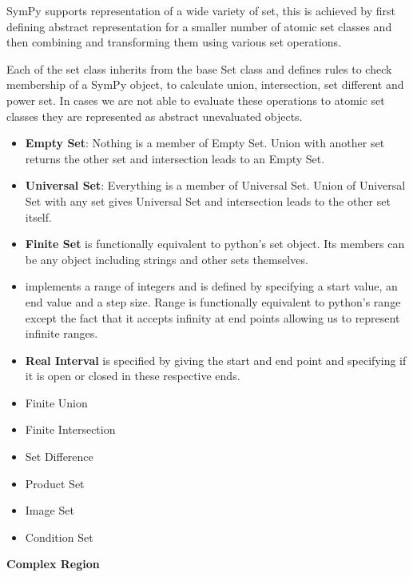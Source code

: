 
SymPy supports representation of a wide variety of set, this is achieved by
first defining abstract representation for a smaller number of atomic set
classes and then combining and transforming them using various set operations.

Each of the set class inherits from the base Set class and defines
rules to check membership of a SymPy object, to calculate union, intersection,
set different and power set. In cases we are not able to evaluate these
operations to atomic set classes they are represented as abstract unevaluated
objects.


\begin{itemize}

    \item \textbf{Empty Set}: Nothing is a member of Empty Set. Union with
another set returns the other set and intersection leads to an Empty Set.

    \item \textbf{Universal Set}: Everything is a member of Universal Set.
Union of Universal Set with any set gives Universal Set and intersection leads
to the other set itself.

    \item \textbf{Finite Set} is functionally equivalent to python's set
object. Its members can be any object including strings and other sets
themselves.

    \item {} implements a range of integers and is defined by
specifying a start value, an end value and a step size. Range is functionally
equivalent to python's range except the fact that it accepts infinity at end
points allowing us to represent infinite ranges.


    \item \textbf{Real Interval} is specified by giving the start and end point
and specifying if it is open or closed in these respective ends.

\end{itemize}



\begin{itemize}
    \item Finite Union
    \item Finite Intersection
    \item Set Difference
    \item Product Set
    \item Image Set
    \item Condition Set
\end{itemize}



    \textbf{Complex Region}



